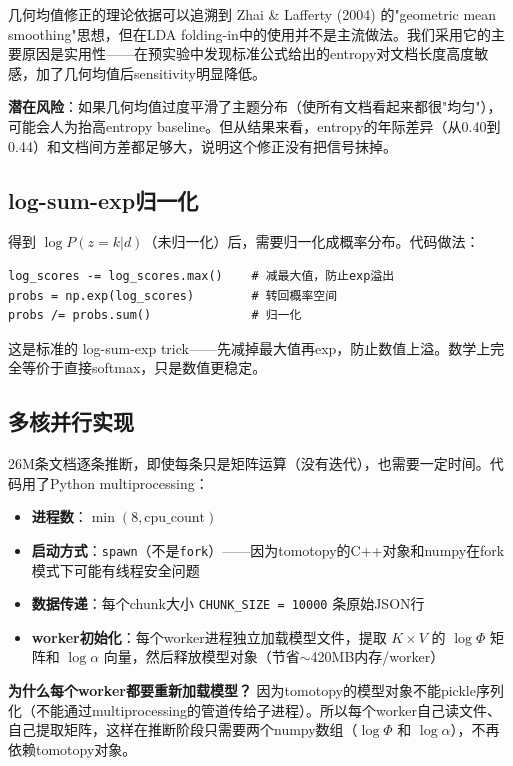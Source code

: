 \documentclass[12pt,a4paper]{ctexart}
\begin{document}
几何均值修正的理论依据可以追溯到 Zhai \& Lafferty (2004) 的"geometric mean smoothing"思想，但在LDA folding-in中的使用并不是主流做法。我们采用它的主要原因是实用性——在预实验中发现标准公式给出的entropy对文档长度高度敏感，加了几何均值后sensitivity明显降低。

\textbf{潜在风险}：如果几何均值过度平滑了主题分布（使所有文档看起来都很"均匀"），可能会人为抬高entropy baseline。但从结果来看，entropy的年际差异（从0.40到0.44）和文档间方差都足够大，说明这个修正没有把信号抹掉。

\subsection{log-sum-exp归一化}

得到 $\log P(z=k|d)$（未归一化）后，需要归一化成概率分布。代码做法：

\begin{verbatim}
log_scores -= log_scores.max()    # 减最大值，防止exp溢出
probs = np.exp(log_scores)        # 转回概率空间
probs /= probs.sum()              # 归一化
\end{verbatim}

这是标准的 log-sum-exp trick——先减掉最大值再exp，防止数值上溢。数学上完全等价于直接softmax，只是数值更稳定。

\subsection{多核并行实现}

26M条文档逐条推断，即使每条只是矩阵运算（没有迭代），也需要一定时间。代码用了Python multiprocessing：

\begin{itemize}
\item \textbf{进程数}：$\min(8, \text{cpu\_count})$
\item \textbf{启动方式}：\texttt{spawn}（不是\texttt{fork}）——因为tomotopy的C++对象和numpy在fork模式下可能有线程安全问题
\item \textbf{数据传递}：每个chunk大小 \texttt{CHUNK\_SIZE = 10000} 条原始JSON行
\item \textbf{worker初始化}：每个worker进程独立加载模型文件，提取 $K \times V$ 的 $\log\Phi$ 矩阵和 $\log\alpha$ 向量，然后释放模型对象（节省$\sim$420MB内存/worker）
\end{itemize}

\textbf{为什么每个worker都要重新加载模型？} 因为tomotopy的模型对象不能pickle序列化（不能通过multiprocessing的管道传给子进程）。所以每个worker自己读文件、自己提取矩阵，这样在推断阶段只需要两个numpy数组（$\log\Phi$ 和 $\log\alpha$），不再依赖tomotopy对象。
\end{document}
